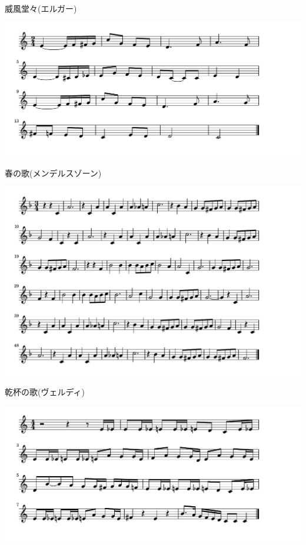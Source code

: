 \documentclass[a4paper]{ltjsarticle}
\begin{document}
\vspace{-10mm} \hspace{10mm}
威風堂々(エルガー)

\includegraphics[clip]{mendelsharunouta_crop.pdf}

\vspace{-10mm} \hspace{10mm}
春の歌(メンデルスゾーン)

\includegraphics[clip]{kanpai_crop.pdf}

\vspace{-10mm} \hspace{10mm}
乾杯の歌(ヴェルディ)

\includegraphics[clip]{radetzky_crop.pdf}
\end{document}
